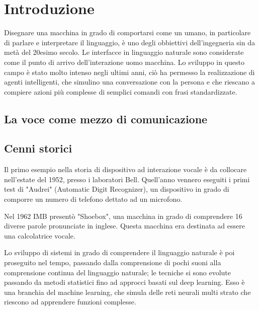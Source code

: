 \documentclass[twoside]{supsistudent}
\begin{document}
\maketitle
\onehalfspacing
\frontmatter



\newpage
\mainmatter
{}
\setcounter{page}{1}

\chapter{Introduzione}

Disegnare una macchina in grado di comportarsi come un umano, in particolare di parlare e interpretare il linguaggio, è uno degli obbiettivi dell'ingegneria sin da metà del 20esimo secolo. Le interfacce in linguaggio naturale sono considerate come il punto di arrivo dell'interazione uomo macchina.
Lo sviluppo in questo campo è stato molto intenso negli ultimi anni, ciò ha permesso la realizzazione di agenti intelligenti, che simulino una conversazione con la persona e che riescano a compiere azioni più complesse di semplici comandi con frasi standardizzate.

\section{La voce come mezzo di comunicazione}

\section{Cenni storici}

Il primo esempio nella storia di dispositivo ad interazione vocale è da collocare nell'estate del 1952, presso i laboratori Bell.
Quell'anno vennero eseguiti i primi test di "Audrei" (Automatic Digit Recognizer), un dispositivo in grado di comporre un numero di telefono dettato ad un microfono.

Nel 1962 IMB presentò "Shoebox", una macchina in grado di comprendere 16 diverse parole pronunciate in inglese. Questa macchina era destinata ad essere una calcolatrice vocale.

Lo sviluppo di sistemi in grado di comprendere il linguaggio naturale è poi proseguito nel tempo, passando dalla comprensione di pochi suoni alla comprensione continua del linguaggio naturale; le tecniche si sono evolute passando da metodi statistici fino ad approcci basati sul deep learning. Esso è una branchia del machine learning, che simula delle reti neurali multi strato che riescono ad apprendere funzioni complesse. \cite{deeplearninggeneral}
\end{document}
